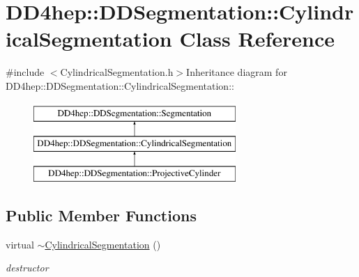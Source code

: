 \hypertarget{class_d_d4hep_1_1_d_d_segmentation_1_1_cylindrical_segmentation}{
\section{DD4hep::DDSegmentation::CylindricalSegmentation Class Reference}
\label{class_d_d4hep_1_1_d_d_segmentation_1_1_cylindrical_segmentation}
}


{\ttfamily \#include $<$CylindricalSegmentation.h$>$}Inheritance diagram for DD4hep::DDSegmentation::CylindricalSegmentation::\begin{figure}[H]
\begin{center}
\leavevmode
\includegraphics[height=3cm]{class_d_d4hep_1_1_d_d_segmentation_1_1_cylindrical_segmentation}
\end{center}
\end{figure}
\subsection*{Public Member Functions}
\begin{DoxyCompactItemize}
\item 
virtual \hyperlink{class_d_d4hep_1_1_d_d_segmentation_1_1_cylindrical_segmentation_a7f069ce1b0c511e208a847ad3e5ddef7}{$\sim$CylindricalSegmentation} ()
\begin{DoxyCompactList}\small\item\em destructor \item\end{DoxyCompactList}\end{DoxyCompactItemize}
